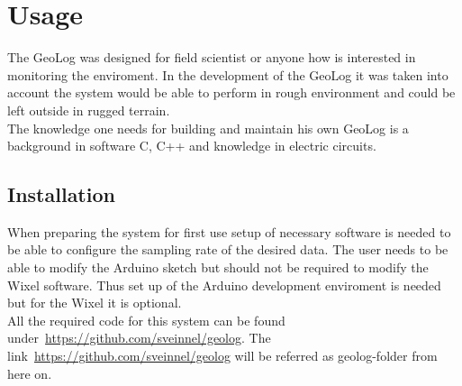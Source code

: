 \section{Usage}
The GeoLog was designed for field scientist or anyone how is interested in monitoring the enviroment. In the development of the GeoLog it was taken into account the system would be able to perform in rough environment and could be left outside in rugged terrain.\\
The knowledge one needs for building and maintain his own GeoLog is a background in software C, C++ and knowledge in electric circuits. %

\subsection{Installation}
When preparing the system for first use setup of necessary software is needed to be able to configure the sampling rate of the desired data. The user needs to be able to modify the Arduino sketch but should not be required to modify the Wixel software. Thus set up of the Arduino development enviroment is needed but for the Wixel it is optional.\\
All the required code for this system can be found under~\url{https://github.com/sveinnel/geolog}. The link~\url{https://github.com/sveinnel/geolog} will be referred as geolog-folder from here on.\\

